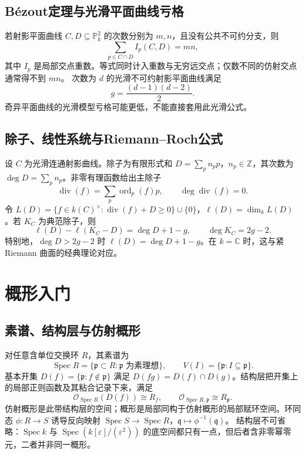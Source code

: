 \documentclass[../main.tex]{subfiles}
\begin{document}
\subsection{Bézout定理与光滑平面曲线亏格}
若射影平面曲线 $C,D\subseteq\mathbb P_k^2$ 的次数分别为 $m,n$，且没有公共不可约分支，则
\[
\sum_{p\in C\cap D}I_p(C,D)=mn,
\]
其中 $I_p$ 是局部交点重数。等式同时计入重数与无穷远交点；仅数不同的仿射交点通常得不到 $mn$。
次数为 $d$ 的光滑不可约射影平面曲线满足
\[
g=\frac{(d-1)(d-2)}2.
\]
奇异平面曲线的光滑模型亏格可能更低，不能直接套用此光滑公式。
\subsection{除子、线性系统与Riemann--Roch公式}
设 $C$ 为光滑连通射影曲线。除子为有限形式和 $D=\sum_pn_pp$，$n_p\in\mathbb Z$，其次数为 $\deg D=\sum_pn_p$。非零有理函数给出主除子
\[
\operatorname{div}(f)=\sum_p\operatorname{ord}_p(f)p,\qquad
\deg\operatorname{div}(f)=0.
\]
令 $L(D)=\{f\in k(C)^\times:\operatorname{div}(f)+D\ge0\}\cup\{0\}$，$\ell(D)=\dim_kL(D)$。若 $K_C$ 为典范除子，则
\[
\ell(D)-\ell(K_C-D)=\deg D+1-g,\qquad\deg K_C=2g-2.
\]
特别地，$\deg D>2g-2$ 时 $\ell(D)=\deg D+1-g$。在 $k=\mathbb C$ 时，这与紧 Riemann 曲面的经典理论对应。
\section{概形入门}
\subsection{素谱、结构层与仿射概形}
对任意含单位交换环 $R$，其素谱为
\[
\operatorname{Spec}R=\{\mathfrak p\subset R:\mathfrak p\text{ 为素理想}\},\qquad
V(I)=\{\mathfrak p:I\subseteq\mathfrak p\}.
\]
基本开集 $D(f)=\{\mathfrak p:f\notin\mathfrak p\}$ 满足 $D(fg)=D(f)\cap D(g)$。结构层把开集上的局部正则函数及其粘合记录下来，满足
\[
\mathcal O_{\operatorname{Spec}R}(D(f))\cong R_f,\qquad
\mathcal O_{\operatorname{Spec}R,\mathfrak p}\cong R_{\mathfrak p}.
\]
仿射概形是此带结构层的空间；概形是局部同构于仿射概形的局部赋环空间。环同态 $\phi:R\to S$ 诱导反向映射 $\operatorname{Spec}S\to\operatorname{Spec}R$，$\mathfrak q\mapsto\phi^{-1}(\mathfrak q)$。
结构层不可省略：$\operatorname{Spec}k$ 与 $\operatorname{Spec}(k[\varepsilon]/(\varepsilon^2))$ 的底空间都只有一点，但后者含非零幂零元，二者并非同一概形。
\end{document}
